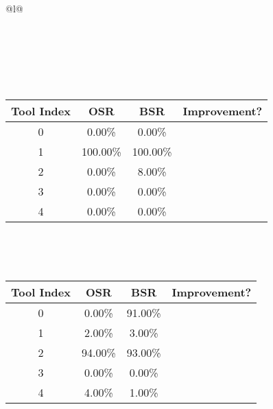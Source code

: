 \begin{longtable}{@{}l@{}}
\caption{Tool selection results for phi4-mini-tool-prompt on ollama. \\ \textbf{Overall Improvement: 48.00\%}} \\
\toprule
{} \\
\midrule
\endfirsthead
\toprule
{} \\
\midrule
\endhead
\bottomrule
\endfoot
\begin{minipage}{\textwidth}
\centering{}\\[0.8ex]
\begin{tabular}{|c|c|c|c|} \hline
\textbf{Tool Index} & \textbf{OSR} & \textbf{ BSR} & \textbf{Improvement?} \\ \hline
0 & 0.00\% & 0.00\% & \textcolor{red}{\ding{55}} \\ \hline
1 & 100.00\% & 100.00\% & \textcolor{red}{\ding{55}} \\ \hline
2 & 0.00\% & 8.00\% & \textcolor{green}{\ding{51}} \\ \hline
3 & 0.00\% & 0.00\% & \textcolor{red}{\ding{55}} \\ \hline
4 & 0.00\% & 0.00\% & \textcolor{red}{\ding{55}} \\ \hline
\end{tabular}
\end{minipage}\\[2ex]
\begin{minipage}{\textwidth}
\centering\vspace{2ex}
\\[0.8ex]
\begin{tabular}{|c|c|c|c|} \hline
\textbf{Tool Index} & \textbf{OSR} & \textbf{ BSR} & \textbf{Improvement?} \\ \hline
0 & 0.00\% & 91.00\% & \textcolor{green}{\ding{51}} \\ \hline
1 & 2.00\% & 3.00\% & \textcolor{green}{\ding{51}} \\ \hline
2 & 94.00\% & 93.00\% & \textcolor{red}{\ding{55}} \\ \hline
3 & 0.00\% & 0.00\% & \textcolor{red}{\ding{55}} \\ \hline
4 & 4.00\% & 1.00\% & \textcolor{red}{\ding{55}} \\ \hline
\end{tabular}

\end{minipage}
\end{longtable}
